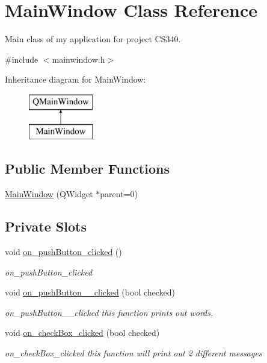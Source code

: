\hypertarget{class_main_window}{\section{Main\-Window Class Reference}
\label{class_main_window}
}


Main class of my application for project C\-S340.  




{\ttfamily \#include $<$mainwindow.\-h$>$}

Inheritance diagram for Main\-Window\-:\begin{figure}[H]
\begin{center}
\leavevmode
\includegraphics[height=2.000000cm]{class_main_window}
\end{center}
\end{figure}
\subsection*{Public Member Functions}
\begin{DoxyCompactItemize}
\item 
\hyperlink{class_main_window_a8b244be8b7b7db1b08de2a2acb9409db}{Main\-Window} (Q\-Widget $\ast$parent=0)
\end{DoxyCompactItemize}
\subsection*{Private Slots}
\begin{DoxyCompactItemize}
\item 
void \hyperlink{class_main_window_a4de79c63c7fa0b8d7c468ac71f20be81}{on\-\_\-push\-Button\-\_\-clicked} ()
\begin{DoxyCompactList}\small\item\em on\-\_\-push\-Button\-\_\-clicked \end{DoxyCompactList}\item 
void \hyperlink{class_main_window_a004997d6cd86a490b38ad2296c985d01}{on\-\_\-push\-Button\-\_\-\_\-clicked} (bool checked)
\begin{DoxyCompactList}\small\item\em on\-\_\-push\-Button\-\_\-\_\-clicked this function prints out words. \end{DoxyCompactList}\item 
void \hyperlink{class_main_window_a008fea9a9dfe8236e3b768b2113bb21e}{on\-\_\-check\-Box\-\_\-clicked} (bool checked)
\begin{DoxyCompactList}\small\item\em on\-\_\-check\-Box\-\_\-clicked this function will print out 2 different messages \end{DoxyCompactList}\end{DoxyCompactItemize}
